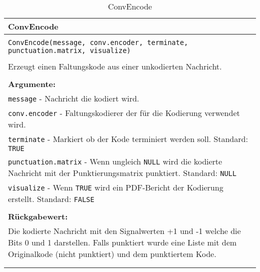 \begin{longtable}{|p{\textwidth}|}
\hline
\rowcolor{lightblue}
ConvEncode
\\
\hline
\\
\texttt{ConvEncode(message, conv.encoder, terminate, punctuation.matrix, visualize)}\\
\\
Erzeugt einen Faltungskode aus einer unkodierten Nachricht.\\
\\
\textbf{Argumente:}\\
\texttt{message} - Nachricht die kodiert wird.\\
\texttt{conv.encoder} - Faltungskodierer der für die Kodierung verwendet wird.\\
\texttt{terminate} - Markiert ob der Kode terminiert werden soll. Standard: \texttt{TRUE}\\
\texttt{punctuation.matrix} - Wenn ungleich \texttt{NULL} wird die kodierte Nachricht mit der Punktierungsmatrix punktiert. Standard: \texttt{NULL}\\
\texttt{visualize} - Wenn \texttt{TRUE} wird ein PDF-Bericht der Kodierung erstellt. Standard: \texttt{FALSE}\\
\\
\textbf{Rückgabewert:}\\
Die kodierte Nachricht mit den Signalwerten +1 und -1 welche die Bits 0 und 1 darstellen. Falls punktiert wurde eine Liste mit dem Originalkode (nicht punktiert) und dem punktiertem Kode.\\
\\
\hline
\caption{ConvEncode}
\label{funktion:ConvEncode}
\end{longtable}